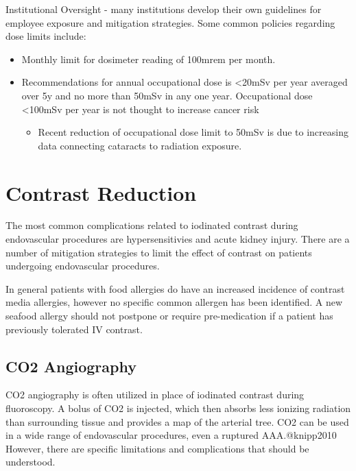 \documentclass[
]{book}
\providecommand{\tightlist}{%
  \setlength{\itemsep}{0pt}\setlength{\parskip}{0pt}}
\begin{document}
Institutional Oversight - many institutions develop their own guidelines
for employee exposure and mitigation strategies. Some common policies
regarding dose limits include:

\begin{itemize}
\item
  Monthly limit for dosimeter reading of 100mrem per month.
\item
  Recommendations for annual occupational dose is \textless20mSv per year
  averaged over 5y and no more than 50mSv in any one year.
  Occupational dose \textless100mSv per year is not thought to increase
  cancer risk

  \begin{itemize}
  \tightlist
  \item
    Recent reduction of occupational dose limit to 50mSv is due to
    increasing data connecting cataracts to radiation
    exposure.\citep{hamada2017}
  \end{itemize}
\end{itemize}

\hypertarget{contrast-reduction}{%
\section{Contrast Reduction}\label{contrast-reduction}}

The most common complications related to iodinated contrast during
endovascular procedures are hypersensitivies and acute kidney injury.
There are a number of mitigation strategies to limit the effect of
contrast on patients undergoing endovascular procedures.

In general patients with food allergies do have an increased incidence
of contrast media allergies, however no specific common allergen has
been identified. A new seafood allergy should not postpone or require
pre-medication if a patient has previously tolerated IV
contrast.\citep{schabelman2010}

\hypertarget{co2-angiography}{%
\subsection{CO2 Angiography}\label{co2-angiography}}

CO2 angiography is often utilized in place of iodinated contrast during
fluoroscopy. A bolus of CO2 is injected, which then absorbs less
ionizing radiation than surrounding tissue and provides a map of the
arterial tree. CO2 can be used in a wide range of endovascular
procedures, even a ruptured AAA.@knipp2010 However, there are specific
limitations and complications that should be understood.
\end{document}
